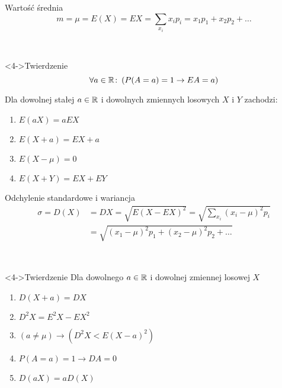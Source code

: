 \documentclass{mp}
\subtitle{Momenty zmiennych losowych}
\begin{document}
\frame{\titlepage}

\begin{frame}{Wartość średnia}
\[ m=\mu=E(X)=EX=\sum_{x_i} x_ip_i=x_1p_1+x_2p_2+\ldots \]
{
	\begin{center}
	     \\
	\only<3->{\dice{1} \dice{2} \dice{3} \dice{6} \dice{6} \dice{6}}
	\end{center}
}
\begin{block}<4->{Twierdzenie}
{
	\[\forall a\in\mathbb{R}\colon \left( P(A=a)=1 \to EA=a \right) \]
}
{
Dla dowolnej stałej $a\in\mathbb{R}$ i dowolnych zmiennych losowych $X$ i $Y$ zachodzi:
\begin{enumerate}
\item<5-> $E(aX)=aEX$
\item<6-> $E(X+a)=EX+a$
\item<7-> $E(X-\mu)=0$
\item<8-> $E(X+Y)=EX+EY$ %
\end{enumerate}
}
\end{block}
\end{frame}
\begin{frame}{Odchylenie standardowe i wariancja}
\begin{align*}
 \sigma=D(X)&=DX=\sqrt{E(X-EX)^2} =\sqrt{\sum_{x_i}(x_i-\mu)^2p_i} \\ & =
 \sqrt{(x_1-\mu)^2p_1+(x_2-\mu)^2p_2+\ldots}
\end{align*}
{
	\begin{center}
	     \\
	\only<3->{\dice{1} \dice{2} \dice{3} \dice{6} \dice{6} \dice{6}}
	\end{center}
}
\begin{block}<4->{Twierdzenie}
	Dla dowolnego $a\in\mathbb{R}$ i dowolnej zmiennej losowej $X$
\begin{enumerate}
\item<4-> $D(X+a)=DX $
\item<5-> $D^2X=E^2X-EX^2 $
\item<6-> $(a\neq \mu)\to (D^2X<E(X-a)^2) $
\item<7-> $P(A=a)=1 \to DA=0 $
\item<8-> $D(aX)=aD(X) $
\end{enumerate}
\end{block}
\end{frame}
\end{document}
